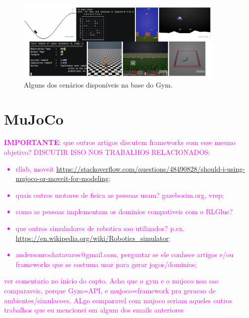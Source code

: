 \documentclass[cic,tc]{iiufrgs}
\newcommand\bruno[1]{\textcolor{magenta}{#1}}
\begin{document}
\begin{figure}[h]
    \caption{Alguns dos cenários disponíveis na base do Gym.}
    \begin{center}
      \includegraphics[width=0.9\textwidth]{environments.png}
    \end{center}
    \label{fig:gymenvironments}
\end{figure}


\section{MuJoCo}

\bruno{\textbf{IMPORTANTE}: que outros artigos discutem frameworks com esse mesmo objetivo? DISCUTIR ISSO NOS TRABALHOS RELACIONADOS:
\begin{itemize}
    \item rllab, moveit \url{https://stackoverflow.com/questions/48490828/should-i-using-mujoco-or-moveit-for-modeling};
    \item quais outros motores de fisica as pessoas usam? gazebosim.org, vrep;
    \item como as pessoas implementam os dominios compativeis com o RLGlue?
    \item que outros simuladores de robotica sao utilizados? p.ex. \url{https://en.wikipedia.org/wiki/Robotics_simulator};
    \item andersonrochatavares@gmail.com, perguntar se ele conhece artigos e/ou frameworks que se costuma usar para gerar jogos/dominios;
\end{itemize}
}


\bruno{ver comentario no inicio do capto. Acho que o gym e o mujoco nao sao comparaveis, porque Gym=API, e mujoco=framework pra geracao de ambientes/simulacoes. ALgo comparavel com mujoco seriam aqueles outros trabalhos que eu mencionei em algum dos emails anteriores}
\end{document}
